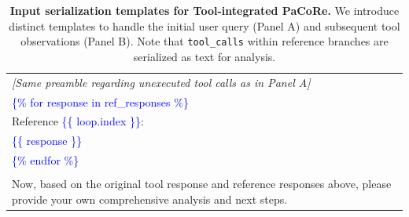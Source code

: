 \begin{table}[h]
{\begin{tabular}{l}
            \textit{[Same preamble regarding unexecuted tool calls as in Panel A]} \\
            \textcolor{blue}{ \{\% for response in ref\_responses \%\} } \\
            Reference \textcolor{blue}{\{\{ loop.index \}\}}: \\
            \textcolor{blue}{ \{\{ response \}\} } \\
            \textcolor{blue}{ \{\% endfor \%\} } \\
            \\
            Now, based on the original tool response and reference responses above, please provide your own comprehensive analysis and next steps. \\
            \bottomrule
        \end{tabular}
    }
    \caption{\textbf{Input serialization templates for Tool-integrated PaCoRe.} We introduce distinct templates to handle the initial user query (Panel A) and subsequent tool observations (Panel B). Note that \texttt{tool\_calls} within reference branches are serialized as text for analysis.}
    \label{tab:pacore-tool-template}
\end{table}